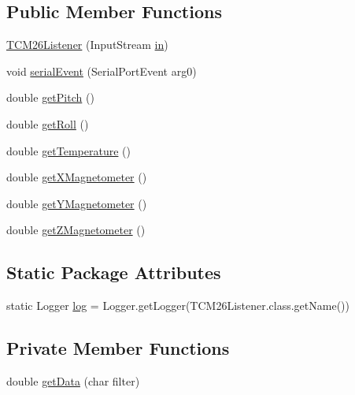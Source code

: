 \subsection*{Public Member Functions}
\begin{DoxyCompactItemize}
\item 
\hyperlink{classrob_o_s2_1_1hardware_1_1pni_1_1tcm26_1_1_t_c_m26_listener_ad8463b30e18a6508a9c9a91b600d0121}{TCM26Listener} (InputStream \hyperlink{classrob_o_s2_1_1hardware_1_1pni_1_1tcm26_1_1_t_c_m26_listener_ad6bed7d02d5d702afb7e8b6ab1cf3ae0}{in})
\item 
void \hyperlink{classrob_o_s2_1_1hardware_1_1pni_1_1tcm26_1_1_t_c_m26_listener_a1f51e6642c4e92776182a0dacc2c443e}{serialEvent} (SerialPortEvent arg0)
\item 
double \hyperlink{classrob_o_s2_1_1hardware_1_1pni_1_1tcm26_1_1_t_c_m26_listener_a77f29bc2a0dcd969a8742caaa38b9c5f}{getPitch} ()
\item 
double \hyperlink{classrob_o_s2_1_1hardware_1_1pni_1_1tcm26_1_1_t_c_m26_listener_a8e36abcfedc1892963bd945db39bb432}{getRoll} ()
\item 
double \hyperlink{classrob_o_s2_1_1hardware_1_1pni_1_1tcm26_1_1_t_c_m26_listener_aac44cc3eb840cd9784f3e2446e82e262}{getTemperature} ()
\item 
double \hyperlink{classrob_o_s2_1_1hardware_1_1pni_1_1tcm26_1_1_t_c_m26_listener_a725066fbf5b4a2bf3c0d2c034392a822}{getXMagnetometer} ()
\item 
double \hyperlink{classrob_o_s2_1_1hardware_1_1pni_1_1tcm26_1_1_t_c_m26_listener_ac4c706b647cb31001047a5ed8e97880c}{getYMagnetometer} ()
\item 
double \hyperlink{classrob_o_s2_1_1hardware_1_1pni_1_1tcm26_1_1_t_c_m26_listener_a30ff0985b7156a1e7f6bdc91fb855d8e}{getZMagnetometer} ()
\end{DoxyCompactItemize}
\subsection*{Static Package Attributes}
\begin{DoxyCompactItemize}
\item 
static Logger \hyperlink{classrob_o_s2_1_1hardware_1_1pni_1_1tcm26_1_1_t_c_m26_listener_a05a5a1830d9d0d14a9a6e9f058ce8baf}{log} = Logger.getLogger(TCM26Listener.class.getName())
\end{DoxyCompactItemize}
\subsection*{Private Member Functions}
\begin{DoxyCompactItemize}
\item 
double \hyperlink{classrob_o_s2_1_1hardware_1_1pni_1_1tcm26_1_1_t_c_m26_listener_a84d92c36b6b50267b62da94a293ddc6d}{getData} (char filter)
\end{DoxyCompactItemize}
